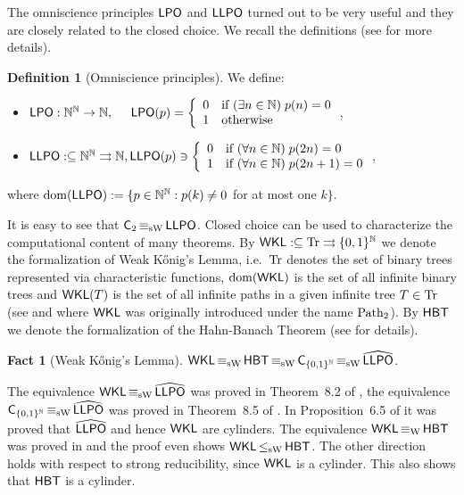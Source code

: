 \documentclass[a4paper]{amsart}
\def\IN{{\mathbb{N}}}
\def\In{\subseteq}
\def\mto{\rightrightarrows}
\def\dom{{\rm dom}}
\def\Cantor{{\{0,1\}^\IN}}
\def\Tr{{\rm Tr}}
\def\LPO{\text{\rm\sffamily LPO}}
\def\LLPO{\text{\rm\sffamily LLPO}}
\def\WKL{\text{\rm\sffamily WKL}}
\def\HBT{\text{\rm\sffamily HBT}}
\def\C{\mbox{\rm\sffamily C}}
\def\LPO{\mbox{\rm\sffamily LPO}}
\def\LLPO{\mbox{\rm\sffamily LLPO}}
\def\equivW{\mathop{\equiv_{\mathrm{W}}}}
\def\leqSW{\mathop{\leq_{\mathrm{sW}}}}
\def\equivSW{\mathop{\equiv_{\mathrm{sW}}}}
\newtheorem{fact}[theorem]{Fact}
\theoremstyle{definition}
\newtheorem{definition}[theorem]{Definition}
\begin{document}
The omniscience principles $\LPO$ and $\LLPO$ turned out to be very useful and they are closely related to the
closed choice. We recall the definitions (see \cite{BG11} for more details).

\begin{definition}[Omniscience principles]
We define:
\begin{itemize}
\item $\LPO:\IN^\IN\to\IN,\hspace{4.9mm}\LPO(p)=\left\{\begin{array}{ll}
       0 & \mbox{if $(\exists n\in\IN)\;p(n)=0$}\\
       1 & \mbox{otherwise}
       \end{array}\right.$,
\item $\LLPO:\In\IN^\IN\mto\IN,\LLPO(p)\ni\left\{\begin{array}{ll}
       0 & \mbox{if $(\forall n\in\IN)\;p(2n)=0$}\\
       1 & \mbox{if $(\forall n\in\IN)\;p(2n+1)=0$}
       \end{array}\right.$,
\end{itemize}
where $\dom(\LLPO):=\{p\in\IN^\IN:p(k)\not=0$ for at most one $k\}$.
\end{definition}

It is easy to see that $\C_2\equivSW\LLPO$.
Closed choice can be used to characterize the computational content of many
theorems. By $\WKL:\In\Tr\mto\{0,1\}^\IN$ we denote the formalization of Weak K\H{o}nig's Lemma,
i.e.\ $\Tr$ denotes the set of binary trees represented via characteristic functions, $\dom(\WKL)$ is the
set of all infinite binary trees and $\WKL(T)$ is the set of all infinite paths in a given infinite tree $T\in\Tr$ (see \cite{BG11}
and \cite{GM09} where $\WKL$ was originally introduced under the name ${\rm Path}_2$).
By $\HBT$ we denote the formalization of the Hahn-Banach Theorem (see \cite{GM09} for details). 

\begin{fact}[Weak K\H{o}nig's Lemma]
\label{fact:WKL}
$\WKL\equivSW\HBT\equivSW\C_{\Cantor}\equivSW\widehat{\LLPO}$.
\end{fact}

The equivalence $\WKL\equivSW\widehat{\LLPO}$ was proved in Theorem~8.2 of \cite{BG11},
the equivalence $\C_\Cantor\equivSW\widehat{\LLPO}$ was proved in Theorem~8.5 of \cite{BG11}.
In Proposition~6.5 of \cite{BG11} it was proved that $\widehat{\LLPO}$ and hence $\WKL$ are cylinders.
The equivalence $\WKL\equivW\HBT$ was proved in \cite{GM09} and the proof even shows $\WKL\leqSW\HBT$.
The other direction holds with respect to strong reducibility, since $\WKL$ is a cylinder.
This also shows that $\HBT$ is a cylinder.
\end{document}
